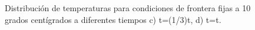 \documentclass{report}
\begin{document}
\begin{figure}[H]
    \centering 
    \caption{Distribución de temperaturas para condiciones de frontera fijas a 10 grados centígrados a diferentes tiempos c) t=(1/3)t, d) t=t.}
    \label{fig:CondicionesFijasTemp}
\end{figure}
\end{document}
